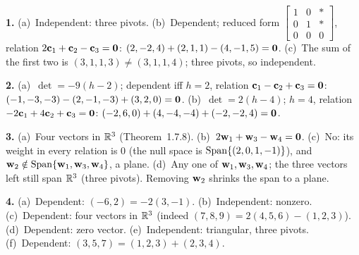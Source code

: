 \documentclass[11pt]{article}
\begin{document}
\begin{sol}
\textbf{1.} (a)~Independent: three pivots. (b)~Dependent; reduced form $\begin{bmatrix}1&0&\ast\\0&1&\ast\\0&0&0\end{bmatrix}$, relation $2\mathbf{c}_1+\mathbf{c}_2-\mathbf{c}_3=\mathbf{0}$: $(2,-2,4)+(2,1,1)-(4,-1,5)=\mathbf{0}$. (c)~The sum of the first two is $(3,1,1,3)\neq(3,1,1,4)$; three pivots, so independent.

\textbf{2.} (a)~$\det=-9(h-2)$; dependent iff $h=2$, relation $\mathbf{c}_1-\mathbf{c}_2+\mathbf{c}_3=\mathbf{0}$: $(-1,-3,-3)-(2,-1,-3)+(3,2,0)=\mathbf{0}$. (b)~$\det=2(h-4)$; $h=4$, relation $-2\mathbf{c}_1+4\mathbf{c}_2+\mathbf{c}_3=\mathbf{0}$: $(-2,6,0)+(4,-4,-4)+(-2,-2,4)=\mathbf{0}$.

\textbf{3.} (a)~Four vectors in $\mathbb{R}^3$ (Theorem~1.7.8). (b)~$2\mathbf{w}_1+\mathbf{w}_3-\mathbf{w}_4=\mathbf{0}$. (c)~No: its weight in every relation is $0$ (the null space is $\operatorname{Span}\{(2,0,1,-1)\}$), and $\mathbf{w}_2\notin\operatorname{Span}\{\mathbf{w}_1,\mathbf{w}_3,\mathbf{w}_4\}$, a plane. (d)~Any one of $\mathbf{w}_1,\mathbf{w}_3,\mathbf{w}_4$; the three vectors left still span $\mathbb{R}^3$ (three pivots). Removing $\mathbf{w}_2$ shrinks the span to a plane.

\textbf{4.} (a)~Dependent: $(-6,2)=-2(3,-1)$. (b)~Independent: nonzero. (c)~Dependent: four vectors in $\mathbb{R}^3$ (indeed $(7,8,9)=2(4,5,6)-(1,2,3)$). (d)~Dependent: zero vector. (e)~Independent: triangular, three pivots. (f)~Dependent: $(3,5,7)=(1,2,3)+(2,3,4)$.
\end{sol}
\end{document}
